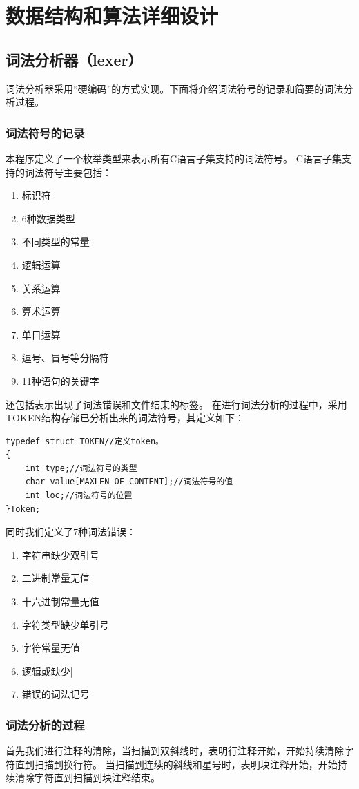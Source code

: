 \documentclass[supercite]{Experimental_Report}
\theoremstyle{definition}
\begin{document}
\newpage
\section{数据结构和算法详细设计}
\subsection{词法分析器（lexer）}
词法分析器采用“硬编码”的方式实现。下面将介绍词法符号的记录和简要的词法分析过程。
\subsubsection{词法符号的记录}
本程序定义了一个枚举类型来表示所有C语言子集支持的词法符号。
C语言子集支持的词法符号主要包括：
\begin{enumerate}
	\item 标识符
	\item 6种数据类型
	\item 不同类型的常量
	\item 逻辑运算
	\item 关系运算
	\item 算术运算
	\item 单目运算
	\item 逗号、冒号等分隔符
	\item 11种语句的关键字
\end{enumerate}
还包括表示出现了词法错误和文件结束的标签。
在进行词法分析的过程中，采用TOKEN结构存储已分析出来的词法符号，其定义如下：
\begin{lstlisting}[title =TOKEN的定义,frame=none]
typedef struct TOKEN//定义token。
{
	int type;//词法符号的类型
	char value[MAXLEN_OF_CONTENT];//词法符号的值
	int loc;//词法符号的位置
}Token;
\end{lstlisting}
同时我们定义了7种词法错误：
\begin{enumerate}
	\item 字符串缺少双引号
	\item 二进制常量无值
	\item 十六进制常量无值
	\item 字符类型缺少单引号
	\item 字符常量无值
	\item 逻辑或缺少|
	\item 错误的词法记号
\end{enumerate}
\subsubsection{词法分析的过程}
首先我们进行注释的清除，当扫描到双斜线时，表明行注释开始，开始持续清除字符直到扫描到换行符。
当扫描到连续的斜线和星号时，表明块注释开始，开始持续清除字符直到扫描到块注释结束。
\end{document}
